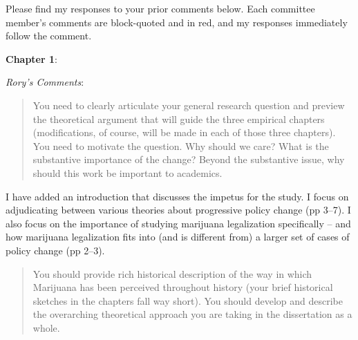 \documentclass[12pt,stdletter,dateno,sigleft]{newlfm} %
\begin{document}
\begin{newlfm}


Please find my responses to your prior comments below. Each committee member's comments are block-quoted and in {\color{red}red}, and my responses immediately follow the comment. \newline%


\textbf{Chapter 1}:

\textit{Rory's Comments}:

\begin{quotation}{\color{red}\noindent \footnotesize
You need to clearly articulate your general research question and preview the theoretical argument that will guide the three empirical chapters (modifications, of course, will be made in each of those three chapters).  You need to motivate the question.  Why should we care?  What is the substantive importance of the change?  Beyond the substantive issue, why should this work be important to academics.
}
\end{quotation}



I have added an introduction that discusses the impetus for the study. I focus on adjudicating between various theories about progressive policy change (pp 3--7). I also focus on the importance of studying marijuana legalization specifically -- and how marijuana legalization fits into (and is different from) a larger set of cases of policy change (pp 2--3). 



\begin{quotation}{\color{red}\noindent \footnotesize
You should provide rich historical description of the way in which Marijuana has been perceived throughout history (your brief historical sketches in the chapters fall way short).  You should develop and describe the overarching theoretical approach you are taking in the dissertation as a whole.
}
\end{quotation}




\end{newlfm}
\end{document}
